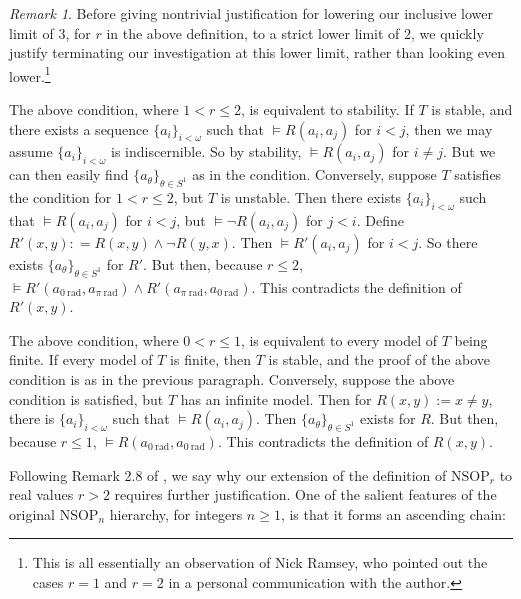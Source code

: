 \documentclass{amsart}
\theoremstyle{definition}
\theoremstyle{remark}
\newtheorem{remark}[theorem]{Remark}
\numberwithin{equation}{section}
\begin{document}
\begin{remark}\label{lower limit}
Before giving nontrivial justification for lowering our inclusive lower limit of $3$, for $r$ in the above definition, to a strict lower limit of $2$, we quickly justify terminating our investigation at this lower limit, rather than looking even lower.\footnote{This is all essentially an observation of Nick Ramsey, who pointed out the cases $r=1$ and $r = 2$ in a personal communication with the author.} 

The above condition, where $1 < r \leq 2$, is equivalent to stability. If $T$ is stable, and there exists a sequence $\{a_{i}\}_{i < \omega}$ such that $\models R(a_{i}, a_{j})$ for $i <j$, then we may assume $\{a_{i}\}_{i < \omega}$ is indiscernible. So by stability, $\models R(a_{i}, a_{j})$ for $i \neq j$. But we can then easily find $\{a_{\theta}\}_{\theta \in S^{1}}$ as in the condition. Conversely, suppose $T$ satisfies the condition for $1 < r \leq 2$, but $T$ is unstable. Then there exists $\{a_{i}\}_{i < \omega}$ such that $\models R(a_{i}, a_{j})$ for $i <j$, but $\models \neg R(a_{i}, a_{j})$ for $j < i$. Define $R'(x, y) : = R(x, y) \wedge \neg R(y, x)$. Then $\models R'(a_{i}, a_{j})$ for $i <j$. So there exists $\{a_{\theta}\}_{\theta \in S^{1}}$ for $R'$. But then, because $r \leq 2$, $\models R'(a_{0\mathrm{\: rad}}, a_{\pi\mathrm{\: rad}}) \wedge R'(a_{\pi\mathrm{\: rad}}, a_{0\mathrm{\: rad}})$. This contradicts the definition of $R'(x, y)$.

The above condition, where $0 < r \leq 1$, is equivalent to every model of $T$ being finite. If every model of $T$ is finite, then $T$ is stable, and the proof of the above condition is as in the previous paragraph. Conversely, suppose the above condition is satisfied, but $T$ has an infinite model. Then for $R(x, y):= x\neq y $, there is  $\{a_{i}\}_{i < \omega}$ such that $\models R(a_{i}, a_{j})$. Then $\{a_{\theta}\}_{\theta \in S^{1}}$ exists for $R$. But then, because $r \leq 1$, $\models R(a_{0 \mathrm{\: rad}}, a_{0 \mathrm{\: rad}})$. This contradicts the definition of $R(x, y)$.


\end{remark}

Following Remark 2.8 of \cite{ApproxOrder}, we say why our extension of the definition of $\mathrm{NSOP}_{r}$ to real values $r > 2$ requires further justification. One of the salient features of the original $\mathrm{NSOP}_{n}$ hierarchy, for integers $n \geq 1$, is that it forms an ascending chain:
\end{document}
